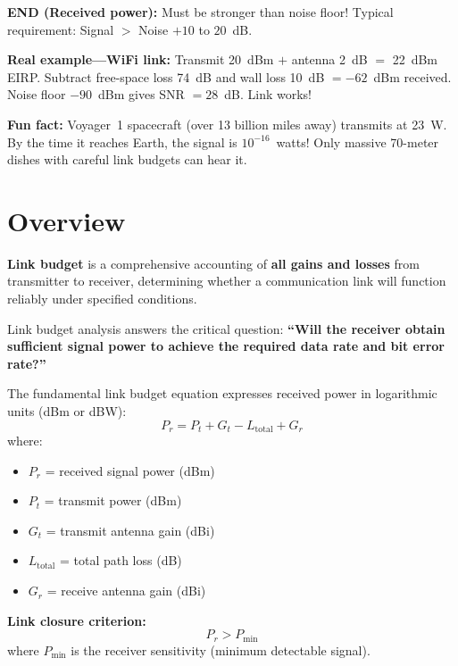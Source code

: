 \begin{nontechnical}
\textbf{END (Received power):} Must be stronger than noise floor! Typical requirement: Signal $>$ Noise $+ 10$ to $20$~dB.

\textbf{Real example---WiFi link:} Transmit 20~dBm $+$ antenna 2~dB $= $ 22~dBm EIRP. Subtract free-space loss 74~dB and wall loss 10~dB $= -62$~dBm received. Noise floor $-90$~dBm gives SNR $= 28$~dB. Link works!

\textbf{Fun fact:} Voyager~1 spacecraft (over 13 billion miles away) transmits at 23~W. By the time it reaches Earth, the signal is $10^{-16}$~watts! Only massive 70-meter dishes with careful link budgets can hear it.
\end{nontechnical}

\section{Overview}

\textbf{Link budget} is a comprehensive accounting of \textbf{all gains and losses} from transmitter to receiver, determining whether a communication link will function reliably under specified conditions.

\begin{keyconcept}
Link budget analysis answers the critical question: \textbf{``Will the receiver obtain sufficient signal power to achieve the required data rate and bit error rate?''}
\end{keyconcept}

The fundamental link budget equation expresses received power in logarithmic units (dBm or dBW):
\begin{equation}
P_r = P_t + G_t - L_{\text{total}} + G_r
\label{eq:link-budget-basic}
\end{equation}
where:
\begin{itemize}
\item $P_r$ = received signal power (dBm)
\item $P_t$ = transmit power (dBm)
\item $G_t$ = transmit antenna gain (dBi)
\item $L_{\text{total}}$ = total path loss (dB)
\item $G_r$ = receive antenna gain (dBi)
\end{itemize}

\textbf{Link closure criterion:}
\begin{equation}
P_r > P_{\text{min}}
\label{eq:link-closure}
\end{equation}
where $P_{\text{min}}$ is the receiver sensitivity (minimum detectable signal).

